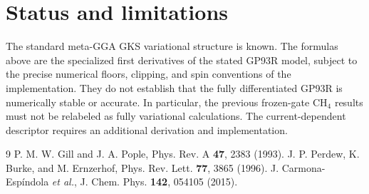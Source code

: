 \documentclass[11pt,a4paper]{article}
\begin{document}
\section{Status and limitations}
The standard meta-GGA GKS variational structure is known. The formulas above are the specialized first derivatives of the stated GP93R model, subject to the precise numerical floors, clipping, and spin conventions of the implementation. They do not establish that the fully differentiated GP93R is numerically stable or accurate. In particular, the previous frozen-gate CH$_4$ results must not be relabeled as fully variational calculations. The current-dependent descriptor requires an additional derivation and implementation.
\begin{thebibliography}{9}
 P. M. W. Gill and J. A. Pople, Phys. Rev. A \textbf{47}, 2383 (1993).
 J. P. Perdew, K. Burke, and M. Ernzerhof, Phys. Rev. Lett. \textbf{77}, 3865 (1996).
 J. Carmona-Esp\'indola \emph{et al.}, J. Chem. Phys. \textbf{142}, 054105 (2015).
\end{thebibliography}
\end{document}
